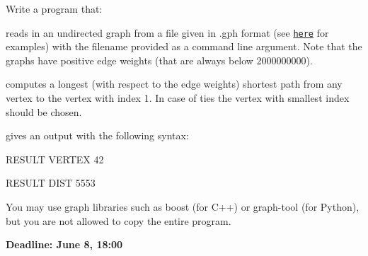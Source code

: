 Write a program that\+:


\begin{DoxyItemize}
\item reads in an undirected graph from a file given in .gph format (see \href{http://www.zib.de/koch/SP/data/}{\tt here} for examples) with the filename provided as a command line argument. Note that the graphs have positive edge weights (that are always below 2000000000).
\item computes a longest (with respect to the edge weights) shortest path from any vertex to the vertex with index 1. In case of ties the vertex with smallest index should be chosen.
\item gives an output with the following syntax\+:

R\+E\+S\+U\+L\+T V\+E\+R\+T\+E\+X 42

R\+E\+S\+U\+L\+T D\+I\+S\+T 5553
\end{DoxyItemize}

You may use graph libraries such as boost (for C++) or graph-\/tool (for Python), but you are not allowed to copy the entire program.

{\bfseries Deadline\+: June 8, 18\+:00} 